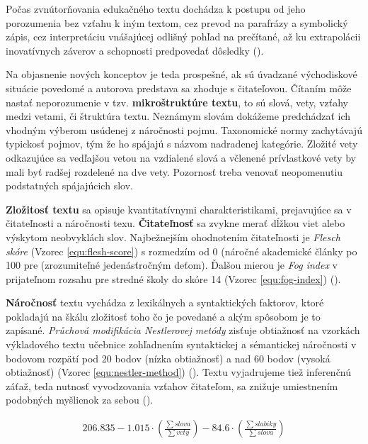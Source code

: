 Počas zvnútorňovania edukačného textu dochádza k postupu od jeho porozumenia bez vzťahu k iným textom, cez prevod na parafrázy a symbolický zápis, cez interpretáciu vnášajúcej odlišný pohľad na prečítané, až ku extrapolácii inovatívnych záverov a schopnosti predpovedať dôsledky (\cite{gavora_ziak_1992}). 

Na objasnenie nových konceptov je teda prospešné, ak sú úvadzané východiskové situácie povedomé a autorova predstava sa zhoduje s čitateľovou. Čítaním môže nastať neporozumenie v tzv. \textbf{mikroštruktúre textu}, to sú slová, vety, vzťahy medzi vetami, či štruktúra textu. Neznámym slovám dokážeme predchádzať ich vhodným výberom usúdenej z náročnosti pojmu. Taxonomické normy zachytávajú typickosť pojmov, tým že ho spájajú s názvom nadradenej kategórie. Zložité vety odkazujúce sa vedľajšou vetou na vzdialené slová a včlenené prívlastkové vety by mali byť radšej rozdelené na dve vety. Pozornosť treba venovať neopomenutiu podstatných spájajúcich slov. 

\textbf{Zložitosť textu} sa opisuje kvantitatívnymi charakteristikami, prejavujúce sa v čitateľnosti a náročnosti texu. \textbf{Čitateľnosť} sa zvykne merať dĺžkou viet alebo výskytom neobvyklách slov. Najbežnejším ohodnotením čitateľnosti je \emph{Flesch skóre} (Vzorec \ref{equ:flesh-score}) s rozmedzím od 0 (náročné akademické články po 100 pre (zrozumiteľné jedenásťročným deťom). Ďalšou mierou je \emph{Fog index} v prijateľnom rozsahu pre stredné školy do skóre 14 (Vzorec \ref{equ:fog-index}) (\cite{drahosova_hodnotenie_2014}). 

\textbf{Náročnosť} textu vychádza z lexikálnych a syntaktických faktorov, ktoré pokladajú na škálu zložitosť toho čo je povedané a akým spôsobom je to zapísané. \emph{Průchová modifikácia Nestlerovej metódy} zisťuje obtiažnosť na vzorkách výkladového textu učebnice zohľadnením syntaktickej a sémantickej náročnosti  v bodovom rozpätí pod 20 bodov (nízka obtiažnosť) a nad 60 bodov (vysoká obtiažnosť) (Vzorec \ref{equ:nestler-method}) (\cite{drahosova_hodnotenie_2014}). Textu vyjadrujeme tiež inferenčnú záťaž, teda nutnosť vyvodzovania vzťahov čitateľom, sa znižuje umiestnením podobných myšlienok za sebou (\cite{pavlovkin_ziak_1989}).

\begin{ceqn}\begin{align}
206.835 - 1.015 \cdot \left(\frac{\sum slova}{\sum vety}\right) - 84.6 \cdot \left(\frac{\sum slabiky}{\sum slova}\right)
\label{equ:flesh-score}
\end{align}\end{ceqn}


